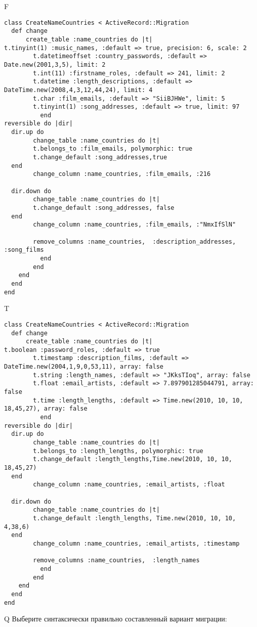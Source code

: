 F
\begin{verbatim}
class CreateNameCountries < ActiveRecord::Migration
  def change
	  create_table :name_countries do |t|
t.tinyint(1) :music_names, :default => true, precision: 6, scale: 2
		t.datetimeoffset :country_passwords, :default => Date.new(2001,3,5), limit: 2
		t.int(11) :firstname_roles, :default => 241, limit: 2
		t.datetime :length_descriptions, :default => DateTime.new(2008,4,3,12,44,24), limit: 4
		t.char :film_emails, :default => "SiiBJHWe", limit: 5
		t.tinyint(1) :song_addresses, :default => true, limit: 97
		  end
reversible do |dir|
  dir.up do
		change_table :name_countries do |t|
		t.belongs_to :film_emails, polymorphic: true
 		t.change_default :song_addresses,true
  end
 		change_column :name_countries, :film_emails, :216
   
  dir.down do
		change_table :name_countries do |t|
		t.change_default :song_addresses, false
  end
 		change_column :name_countries, :film_emails, :"NmxIfSlN"
   
		remove_columns :name_countries,  :description_addresses, :song_films 
	      end
	    end
    end 
  end
end

\end{verbatim}

T
\begin{verbatim}
class CreateNameCountries < ActiveRecord::Migration
  def change
	  create_table :name_countries do |t|
t.boolean :password_roles, :default => true
		t.timestamp :description_films, :default => DateTime.new(2004,1,9,0,53,11), array: false
		t.string :length_names, :default => "JKksTIoq", array: false
		t.float :email_artists, :default => 7.897901285044791, array: false
		t.time :length_lengths, :default => Time.new(2010, 10, 10, 18,45,27), array: false
		  end
reversible do |dir|
  dir.up do
		change_table :name_countries do |t|
		t.belongs_to :length_lengths, polymorphic: true
 		t.change_default :length_lengths,Time.new(2010, 10, 10, 18,45,27)
  end
 		change_column :name_countries, :email_artists, :float
   
  dir.down do
		change_table :name_countries do |t|
		t.change_default :length_lengths, Time.new(2010, 10, 10, 4,38,6)
  end
 		change_column :name_countries, :email_artists, :timestamp
   
		remove_columns :name_countries,  :length_names 
	      end
	    end
    end 
  end
end

\end{verbatim}

Q
Выберите синтаксически правильно составленный вариант миграции:


